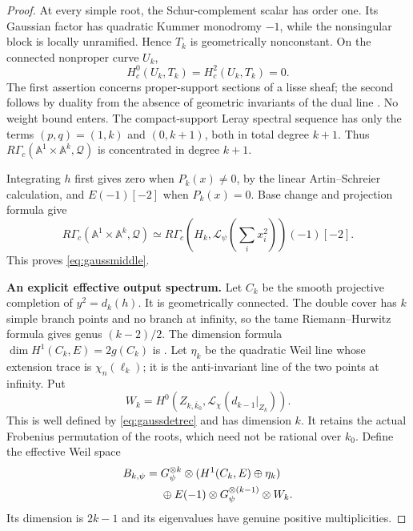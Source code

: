 \documentclass[11pt,a4paper]{article}
\newcommand{\A}{\mathbb A}\newcommand{\PP}{\mathbb P}\newcommand{\GL}{\mathrm{GL}}
\newcommand{\mathscr}{\mathcal}
\theoremstyle{named}\newtheorem{finding}{Finding}[section]
\theoremstyle{definition}\newtheorem{definition}[finding]{Definition}
\theoremstyle{remark}\newtheorem{remark}[finding]{Remark}
\begin{document}
\begin{proof}
At every simple root, the Schur-complement scalar has order
one. Its Gaussian factor has quadratic Kummer monodromy
$-1$, while the nonsingular block is locally unramified.
Hence $T_k$ is geometrically nonconstant. On the connected
nonproper curve $U_k$,
\[
 H_c^0(U_k,T_k)=H_c^2(U_k,T_k)=0.
\]
The first assertion concerns proper-support sections of a
lisse sheaf; the second follows by duality from the absence
of geometric invariants of the dual line
\cite[\emph{Sommes trig.}, 1.18(b)--(d),
pp.~178--179]{SGA45}. No weight bound enters.
The compact-support Leray spectral sequence has only the
terms $(p,q)=(1,k)$ and $(0,k+1)$, both in total degree
$k+1$. Thus $R\Gamma_c(\A^1\times\A^k,\mathscr Q)$ is
concentrated in degree $k+1$.

Integrating $h$ first gives zero when $P_k(x)\ne0$, by the
linear Artin--Schreier calculation, and $E(-1)[-2]$ when
$P_k(x)=0$. Base change and projection formula give
\[
 R\Gamma_c(\A^1\times\A^k,\mathscr Q)
 \simeq
 R\Gamma_c(H_k,\mathcal L_\psi(\textstyle\sum_i x_i^2))(-1)[-2].
\]
This proves \eqref{eq:gaussmiddle}.

\par\smallskip\noindent\textbf{An explicit effective output spectrum.}\quad
Let $C_k$ be the smooth projective completion of
$y^2=d_k(h)$. It is geometrically connected.
The double cover has $k$ simple branch points and no
branch at infinity, so the tame Riemann--Hurwitz formula
\cite[Lemmas~53.12.2 and~53.12.4, tags~0C1D and~0C1F]{StacksRH}
gives genus $(k-2)/2$. The dimension formula
$\dim H^1(C_k,E)=2g(C_k)$ is
\cite[Proposition~14.2, p.~90]{Milne}. Let $\eta_k$ be the quadratic Weil line whose
extension trace is $\chi_n(\ell_k)$; it is the anti-invariant
line of the two points at infinity. Put
\[
 W_k=H^0(Z_{k,\bar k_0},
             \mathcal L_\chi(d_{k-1}|_{Z_k})).
\]
This is well defined by \eqref{eq:gaussdetrec} and has
dimension $k$. It retains the actual Frobenius permutation
of the roots, which need not be rational over $k_0$.
Define the effective Weil space
\begin{align}
 B_{k,\psi}={}&G_\psi^{\otimes k}\otimes
                 (H^1(C_k,E)\oplus\eta_k)\notag\\
 &\oplus E(-1)\otimes G_\psi^{\otimes(k-1)}\otimes W_k .
 \label{eq:gaussoutput}
\end{align}
Its dimension is $2k-1$ and its eigenvalues have genuine
positive multiplicities.


\end{proof}
\end{document}
